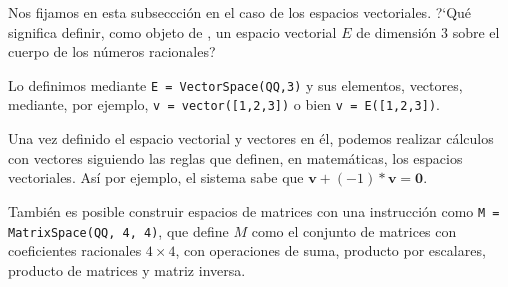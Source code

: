 Nos fijamos en esta subseccci\'on  en el caso de los espacios vectoriales.
?`Qu\'e significa definir, como objeto de {\sage},  un espacio vectorial $E$ de
dimensi\'on $3$ sobre el cuerpo de los n\'umeros racionales?

Lo definimos mediante 
\lstinline|E = VectorSpace(QQ,3)| y sus elementos, vectores, mediante, por
ejemplo, \lstinline|v = vector([1,2,3])| o bien \lstinline|v = E([1,2,3])|.

Una vez definido el espacio vectorial y vectores en \'el, podemos realizar
c\'alculos con vectores siguiendo las reglas que definen, en  matem\'aticas, los
espacios vectoriales. As\'{i} por ejemplo, el sistema sabe que
$\mathbf{v}+(-1)*\mathbf{v}=\mathbf{0}.$

Tambi\'en es posible construir espacios  de matrices con una instrucci\'on como 
\lstinline|M = MatrixSpace(QQ, 4, 4)|, que define $M$ como el conjunto de
matrices con coeficientes racionales $4\times 4$,  con operaciones de suma,
producto por escalares, producto de matrices y matriz inversa.








